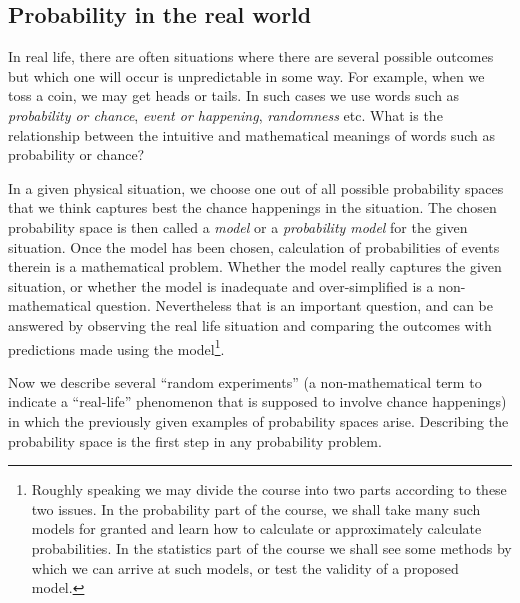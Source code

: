 \documentclass[preprint,  11pt]{amsart}
\theoremstyle{plain} %
\theoremstyle{definition} %
\begin{document}
\subsection{Probability in the real world} In real life, there are often situations where there are several possible outcomes but which one will occur is unpredictable in some way. For example, when we toss a coin, we may get heads or tails. In such cases we use words such as {\em probability or chance}, {\em event or happening}, {\em randomness} etc.  What is the relationship between the intuitive and mathematical meanings of words such as probability or chance?

 In a given physical situation, we choose one out of all possible probability spaces that we think captures best the chance happenings in the situation. The chosen probability space is then called a {\em model} or a {\em probability model} for the given situation. Once the model has been chosen, calculation of probabilities of events therein is a mathematical problem. Whether the model really captures the given situation, or whether the model is inadequate and over-simplified is a non-mathematical question. Nevertheless that is an important question, and can be answered by observing the real life situation and comparing the outcomes with predictions made using the model\footnote{Roughly speaking we may divide the course into two parts according to these two issues. In the probability part of the course, we shall take many such models for granted and learn how to calculate or approximately calculate probabilities. In the statistics part of the course we shall see some methods by which we can arrive at such models, or test the validity of a proposed model.}.

 Now we describe several ``random experiments'' (a non-mathematical term to indicate a ``real-life'' phenomenon that is supposed to involve chance happenings) in which the previously given examples of probability spaces arise. Describing the probability space is the first step in any probability problem.
 
\end{document}

